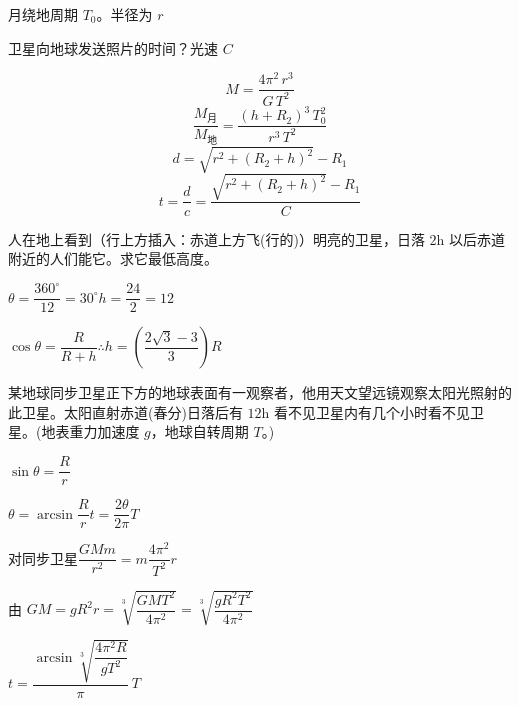 \begin{problem}[4.]

月绕地周期 $T_0$。半径为 $r$

卫星向地球发送照片的时间？光速 $C$
\begin{solution}
\[ M=\frac{4\pi^2\,r^3}{G\,T^2} \]%
\[ \frac{M_{\text{月}}}{M_{\text{地}}}=\frac{(h+R_2)^3\,T_0^2}{r^3\,T^2} \]
\[ d=\sqrt{r^2+(R_2+h)^2}-R_1 \]
\[ t=\frac{d}{c}=\frac{\sqrt{r^2+(R_2+h)^2}-R_1}{C} \]
\end{solution}
\end{problem}
\begin{problem}[5.]

人在地上看到（行上方插入：赤道上方飞(行的)）明亮的卫星，日落 $2\mathrm{h}$ 以后赤道附近的人们能它。求它最低高度。
\begin{solution}
$\theta=\dfrac{360^\circ}{12}=30^\circ$\quad $h=\dfrac{24}{2}=12$

$\cos\theta=\dfrac{R}{R+h}$\quad $\therefore h=\left(\dfrac{2\sqrt{3}-3}{3}\right)R$
\end{solution}
\end{problem}
\begin{problem}

某地球同步卫星正下方的地球表面有一观察者，他用天文望远镜观察太阳光照射的此卫星。太阳直射赤道(春分)日落后有 $12\mathrm{h}$ 看不见卫星内有几个小时看不见卫星。(地表重力加速度 $g$，地球自转周期 $T$。)%
\begin{solution}
$\sin\theta=\dfrac{R}{r}$\quad \struck{$\theta$}%

$\theta=\arcsin\dfrac{R}{r}$\quad $t=\dfrac{2\theta}{2\pi}T$

对同步卫星\quad $\dfrac{GMm}{r^2}=m\dfrac{4\pi^2}{T^2}r$

由 $GM=gR^2$\quad $r=\sqrt[3]{\dfrac{GMT^2}{4\pi^2}}=\sqrt[3]{\dfrac{gR^2T^2}{4\pi^2}}$

$t=\dfrac{\arcsin\sqrt[3]{\dfrac{4\pi^2R}{gT^2}}}{\pi}\,T$%
\end{solution}
\end{problem}
